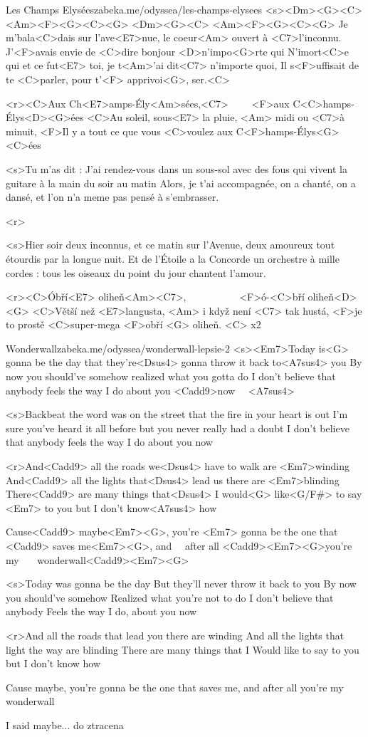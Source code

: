 \begin{song}{66}{Les Champs Elysées}{zabeka.me/odyssea/les-champs-elysees}
	<s><Dm><G><C> <Am><F><G><C><G>
	<Dm><G><C> <Am><F><G><C><G>
	Je m'bala<C>dais sur l'ave<E7>nue, le coeur<Am> ouvert à <C7>l'inconnu.
	J'<F>avais envie de <C>dire bonjour <D>n'impo<G>rte qui
	N'imort<C>e qui et ce fut<E7> toi, je t<Am>'ai dit<C7> n'importe quoi,
	Il s<F>uffisait de te <C>parler, pour t'<F> apprivoi<G>, ser.<C>

	<r><C>Aux Ch<E7>amps-Ély<Am>sées,<C7> \ \ \ \ <F>aux C<C>hamps-Élys<D><G>ées
	<C>Au soleil, sous<E7> la pluie, <Am> midi ou <C7>à minuit,
	<F>Il y a tout ce que vous <C>voulez aux C<F>hamps-Élys<G><C>ées

	<s>Tu m'as dit : J'ai rendez-vous
	dans un sous-sol avec des fous
	qui vivent la guitare à la main
	du soir au matin
	Alors, je t'ai accompagnée,
	on a chanté, on a dansé,
	et l'on n'a meme pas pensé
	à s'embrasser.

	<r>

	<s>Hier soir deux inconnus,
	et ce matin sur l'Avenue,
	deux amoureux tout étourdis
	par la longue nuit.
	Et de l'Étoile a la Concorde
	un orchestre à mille cordes :
	tous les oiseaux du point du jour
	chantent l'amour.

	<r><C>Óbří<E7> oliheň<Am><C7>, \ \ \ \ \ \ \ \ \ \ <F>ó-<C>bří oliheň<D><G>
	<C>Větší než <E7>langusta, <Am> i když není <C7> tak hustá,
	<F>je to prostě <C>super-mega <F>obří <G> oliheň. <C> x2
\end{song}
\begin{song}[Oasis]{67}{Wonderwall}{zabeka.me/odyssea/wonderwall-lepsie-2}
	<s><Em7>Today is<G> gonna be the day
	that they're<Dsus4> gonna throw it back to<A7sus4> you
	By now you should've somehow
	realized what you gotta do
	I don't believe that anybody
	feels the way I do about you <Cadd9>now \ \ <Dsus4><A7sus4>

	<s>Backbeat the word was on the street
	that the fire in your heart is out
	I'm sure you've heard it all before
	but you never really had a doubt
	I don't believe that anybody
	feels the way I do about you now

	<r>And<Cadd9> all the roads we<Dsus4> have to walk are <Em7>winding
	And<Cadd9> all the lights that<Dsus4> lead us there are <Em7>blinding
	There<Cadd9> are many things that<Dsus4> I would<G> like<G/F#> to say <Em7> to you
	but I don't know<A7sus4> how

	Cause<Cadd9> maybe<Em7><G>, you're <Em7> gonna be the one that
	<Cadd9> saves me<Em7><G>, and \ \ <Em7>after all
	<Cadd9><Em7><G>you're my \ \ \ <Em7>wonderwall<Cadd9><Em7><G>

	<s>Today was gonna be the day
	But they'll never throw it back to you
	By now you should've somehow
	Realized what you're not to do
	I don't believe that anybody
	Feels the way I do, about you now

	<r>And all the roads that lead you there are winding
	And all the lights that light the way are blinding
	There are many things that I
	Would like to say to you but I don't know how

	Cause maybe, you're gonna be the one that
	saves me, and after all
	you're my wonderwall

	I said maybe... do ztracena
\end{song}
